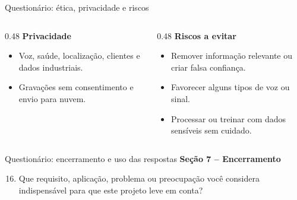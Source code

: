 \documentclass[aspectratio=1610,11pt]{beamer}
\begin{document}
{\begin{frame}[noframenumbering]{Questionário: ética, privacidade e riscos}
    \vspace{0.15cm}
    \begin{columns}[T,onlytextwidth]
        \begin{column}{0.48\textwidth}
            \textbf{Privacidade}
            \begin{itemize}
                \item Voz, saúde, localização, clientes e dados industriais.
                \item Gravações sem consentimento e envio para nuvem.
            \end{itemize}
        \end{column}
        \begin{column}{0.48\textwidth}
            \textbf{Riscos a evitar}
            \begin{itemize}
                \item Remover informação relevante ou criar falsa confiança.
                \item Favorecer alguns tipos de voz ou sinal.
                \item Processar ou treinar com dados sensíveis sem cuidado.
            \end{itemize}
        \end{column}
    \end{columns}
\end{frame}

\begin{frame}[noframenumbering]{Questionário: encerramento e uso das respostas}
    \footnotesize
    \textbf{Seção 7 -- Encerramento}
    \begin{enumerate}
        \setcounter{enumi}{15}
        \item Que requisito, aplicação, problema ou preocupação você considera indispensável para que este projeto leve em conta?
    \end{enumerate}


\end{frame}}
\end{document}
